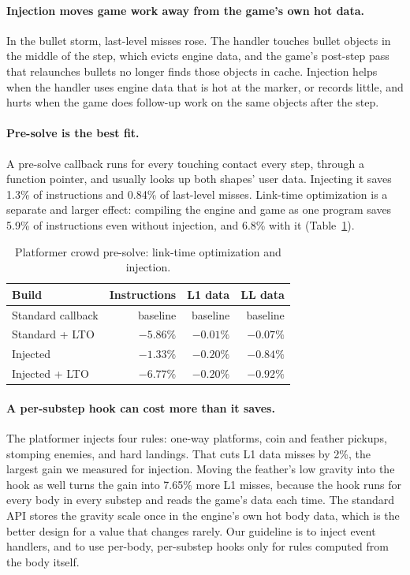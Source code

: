 \documentclass[11pt]{article}
\newcommand{\code}[1]{\texttt{\detokenize{#1}}}
\begin{document}
\paragraph{Injection moves game work away from the game's own hot data.} In the bullet storm,
last-level misses rose. The handler touches bullet objects in the middle of the step, which evicts
engine data, and the game's post-step pass that relaunches bullets no longer finds those objects in
cache. Injection helps when the handler uses engine data that is hot at the marker, or records
little, and hurts when the game does follow-up work on the same objects after the step.

\paragraph{Pre-solve is the best fit.} A pre-solve callback runs for every touching contact every
step, through a function pointer, and usually looks up both shapes' user data. Injecting it saves
1.3\% of instructions and 0.84\% of last-level misses. Link-time optimization is a separate and
larger effect: compiling the engine and game as one program saves 5.9\% of instructions even without
injection, and 6.8\% with it (Table~\ref{tab:lto}).

\begin{table}[ht]
\centering
\caption{Platformer crowd pre-solve: link-time optimization and injection.}
\label{tab:lto}
\begin{tabular}{lrrr}
\toprule
Build & Instructions & L1 data & LL data \\
\midrule
Standard callback & baseline & baseline & baseline \\
Standard + LTO & $-5.86\%$ & $-0.01\%$ & $-0.07\%$ \\
Injected & $-1.33\%$ & $-0.20\%$ & $-0.84\%$ \\
Injected + LTO & $-6.77\%$ & $-0.20\%$ & $-0.92\%$ \\
\bottomrule
\end{tabular}
\end{table}

\paragraph{A per-substep hook can cost more than it saves.} The platformer injects four rules:
one-way platforms, coin and feather pickups, stomping enemies, and hard landings. That cuts L1 data
misses by 2\%, the largest gain we measured for injection. Moving the feather's low gravity into the
\code{body_gravity} hook as well turns the gain into 7.65\% more L1 misses, because the hook runs for
every body in every substep and reads the game's data each time. The standard API stores the
gravity scale once in the engine's own hot body data, which is the better design for a value that
changes rarely. Our guideline is to inject event handlers, and to use per-body, per-substep hooks
only for rules computed from the body itself.
\end{document}
